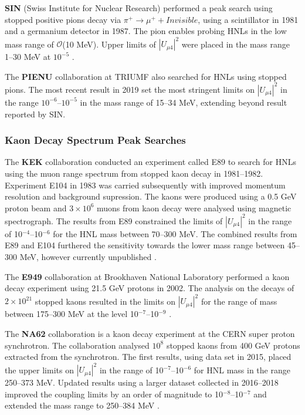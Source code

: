 \begin{coloritemize}
\item \textbf{SIN} (Swiss Institute for Nuclear Research) performed a peak search using stopped positive pions decay via $\pi^{+} \rightarrow \mu^{+} + Invisible$, using a scintillator in 1981 and a germanium detector in 1987.
The pion enables probing HNLs in the low mass range of $\mathcal{O}$(10 MeV).
Upper limits of $|U_{\mu4}|^{2}$ were placed in the mass range 1--30 MeV at $10^{-5}$ \cite{SIN1, SIN2, SIN3}.

\item The \textbf{PIENU} collaboration at TRIUMF \cite{PIENU} also searched for HNLs using stopped pions.
The most recent result in 2019 set the most stringent limits on $|U_{\mu4}|^{2}$ in the range $10^{-6}$--$10^{-5}$ in the mass range of 15--34 MeV, extending beyond result reported by SIN.

\end{coloritemize}

\subsubsection{Kaon Decay Spectrum Peak Searches}

\begin{coloritemize}
\item The \textbf{KEK} collaboration conducted an experiment called E89 to search for HNLs using the muon range spectrum from stopped kaon decay in 1981--1982. Experiment E104 in 1983 was carried subsequently with improved momentum resolution and background supression.
The kaons were produced using a 0.5 GeV proton beam and $3 \times 10^{6}$ muons from kaon decay were analysed using magnetic spectrograph.
The results from E89 constrained the limits of $|U_{\mu4}|^{2}$ in the range of 10$^{-4}$--10$^{-6}$ for the HNL mass between 70--300 MeV.
The combined results from E89 and E104 furthered the sensitivity towards the lower mass range between 45--300 MeV, however currently unpublished \cite{KEK1, KEK2, KEK3}.

\item The \textbf{E949} collaboration at Brookhaven National Laboratory performed a kaon decay experiment using 21.5 GeV protons in 2002.
The analysis on the decays of $2 \times 10^{21}$ stopped kaons resulted in the limits on $|U_{\mu4}|^{2}$ for the range of mass between 175--300 MeV at the level 10$^{-7}$--10$^{-9}$ \cite{E949}.
\item The \textbf{NA62} collaboration is a kaon decay experiment at the CERN super proton synchrotron.
The collaboration analysed $10^{8}$ stopped kaons from 400 GeV protons extracted from the synchrotron.
The first results, using data set in 2015, placed the upper limits on $|U_{\mu4}|^{2}$ in the range of 10$^{-7}$--10$^{-6}$ for HNL mass in the range 250--373 MeV.
Updated results using a larger dataset collected in 2016--2018 improved the coupling limits by an order of magnitude to 10$^{-8}$--10$^{-7}$ and extended the mass range to 250--384 MeV \cite{NA62A, NA62B}.
\end{coloritemize}

